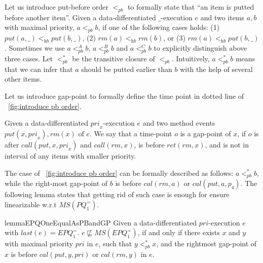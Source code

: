 Let us introduce put-before order $<_{\textit{pb}}$ to formally state that ``an item is putted before another item''. Given a data-differentiated $\_$-execution $e$ and two items $a,b$ with maximal priority, $a <_{\textit{pb}} b$, if one of the following cases holds: (1) $\textit{put}(a,\_) <_{\textit{hb}} \textit{put}(b,\_)$, (2) $\textit{rm}(a) <_{\textit{hb}} \textit{rm}(b)$, or (3) $\textit{rm}(a) <_{\textit{hb}} \textit{put}(b,\_)$. Sometimes we use $a <_{\textit{pb}}^A b$, $a <_{\textit{pb}}^B b$ and $a <_{\textit{pb}}^C b$ to explicitly distinguish above three cases. Let $<_{\textit{pb}}^*$ be the transitive closure of $<_{\textit{pb}}$. Intuitively, $a <_{\textit{pb}}^* b$ means that we can infer that $a$ should be putted earlier than $b$ with the help of several other items.

Let us introduce gap-point to formally define the time point in dotted line of \figurename~\ref{fig:introduce pb order}.

\begin{definition}\label{def:gap-point for matched put and rm operations}
Given a data-differentiated $\textit{pri}_x$-execution $e$ and two method events $\textit{put}(x,\textit{pri}_x),\textit{rm}(x)$ of $e$. We say that a time-point $o$ is a gap-point of $x$, if $o$ is after $\textit{call}(\textit{put},x,\textit{pri}_x)$ and $\textit{call}(\textit{rm},x)$, is before $\textit{ret}(\textit{rm},x)$, and is not in interval of any items with smaller priority.
\end{definition}

The case of \figurename~\ref{fig:introduce pb order} can be formally described as follows: $a <_{\textit{pb}}^* b$, while the right-most gap-point of $b$ is before $\textit{cal}(\textit{rm},a)$ or $\textit{cal}(\textit{put},a,p_4)$. The following lemma states that getting rid of such case is enough for ensure linearizable w.r.t $\textit{MS}(\textit{PQ}_1^{=})$.

\begin{restatable}{lemma}{EPQOneEqualAsPBandGP}
\label{lemma:EPQ1Equal as pb order and gap-point}
Given a data-differentiated $\textit{pri}$-execution $e$ with $\textit{last}(e) = \textit{EPQ}_1^{=}$. $e \not\sqsubseteq \textit{MS}(\textit{EPQ}_1^{=})$, if and only if there exists $x$ and $y$ with maximal priority $\textit{pri}$ in $e$, such that $y <_{\textit{pb}}^* x$, and the rightmost gap-point of $x$ is before $\textit{cal}(\textit{put},y,\textit{pri})$ or $\textit{cal}(\textit{rm},y)$ in $e$.
\end{restatable}

